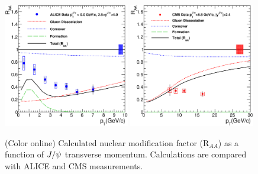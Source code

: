 \documentclass[aps,prc,preprint,superscriptaddress,showpacs,showkeys]{revtex4-1}
\begin{document}
\begin{figure}
\includegraphics[width=0.49\textwidth]{Figures/Fig5a_ALICE_RAAPt.eps}
\includegraphics[width=0.49\textwidth]{Figures/Fig5b_CMS_RAAPt.eps}
\caption{(Color online) Calculated nuclear modification factor (R$_{AA}$) as a function of $J/\psi$ transverse momentum. Calculations are
compared with ALICE and CMS measurements.}
\label{fig:JPsiRaaVsPt}
\end{figure}


\end{document}
